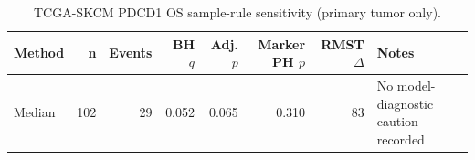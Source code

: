 \begin{table}[t]
\centering
\caption{TCGA-SKCM PDCD1 OS sample-rule sensitivity (primary tumor only).}
\label{tab:skcm-pdcd1-os-primary-tumor-only}
\begin{tabular}{lrrrrrrl}
\toprule
Method & n & Events & BH $q$ & Adj. $p$ & Marker PH $p$ & RMST $\Delta$ & Notes \\
\midrule
Median & 102 & 29 & 0.052 & 0.065 & 0.310 & 83 & No model-diagnostic caution recorded \\
\bottomrule
\end{tabular}
\end{table}
